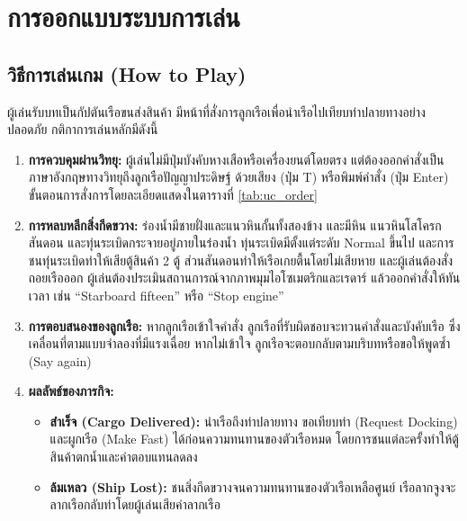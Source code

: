 \section{การออกแบบระบบการเล่น}

\subsection{วิธีการเล่นเกม (How to Play)}

ผู้เล่นรับบทเป็นกัปตันเรือขนส่งสินค้า มีหน้าที่สั่งการลูกเรือเพื่อนำเรือไปเทียบท่าปลายทางอย่างปลอดภัย กติกาการเล่นหลักมีดังนี้

\begin{enumerate}[label=\arabic*)]
    \item \textbf{การควบคุมผ่านวิทยุ:} ผู้เล่นไม่มีปุ่มบังคับหางเสือหรือเครื่องยนต์โดยตรง แต่ต้องออกคำสั่งเป็นภาษาอังกฤษทางวิทยุถึงลูกเรือปัญญาประดิษฐ์ ด้วยเสียง (ปุ่ม T) หรือพิมพ์คำสั่ง (ปุ่ม Enter) ขั้นตอนการสั่งการโดยละเอียดแสดงในตารางที่ \ref{tab:uc_order}
    \item \textbf{การหลบหลีกสิ่งกีดขวาง:} ร่องน้ำมีชายฝั่งและแนวหินกั้นทั้งสองข้าง และมีหิน แนวหินโสโครก สันดอน และทุ่นระเบิดกระจายอยู่ภายในร่องน้ำ ทุ่นระเบิดมีตั้งแต่ระดับ Normal ขึ้นไป และการชนทุ่นระเบิดทำให้เสียตู้สินค้า 2 ตู้ ส่วนสันดอนทำให้เรือเกยตื้นโดยไม่เสียหาย และผู้เล่นต้องสั่งถอยเรือออก ผู้เล่นต้องประเมินสถานการณ์จากภาพมุมไอโซเมตริกและเรดาร์ แล้วออกคำสั่งให้ทันเวลา เช่น ``Starboard fifteen'' หรือ ``Stop engine''
    \item \textbf{การตอบสนองของลูกเรือ:} หากลูกเรือเข้าใจคำสั่ง ลูกเรือที่รับผิดชอบจะทวนคำสั่งและบังคับเรือ ซึ่งเคลื่อนที่ตามแบบจำลองที่มีแรงเฉื่อย หากไม่เข้าใจ ลูกเรือจะตอบกลับตามบริบทหรือขอให้พูดซ้ำ (Say again)
    \item \textbf{ผลลัพธ์ของภารกิจ:}
    \begin{itemize}[leftmargin=1.5em,labelindent=0pt]
        \item \textbf{สำเร็จ (Cargo Delivered):} นำเรือถึงท่าปลายทาง ขอเทียบท่า (Request Docking) และผูกเรือ (Make Fast) ได้ก่อนความทนทานของตัวเรือหมด โดยการชนแต่ละครั้งทำให้ตู้สินค้าตกน้ำและค่าตอบแทนลดลง
        \item \textbf{ล้มเหลว (Ship Lost):} ชนสิ่งกีดขวางจนความทนทานของตัวเรือเหลือศูนย์ เรือลากจูงจะลากเรือกลับท่าโดยผู้เล่นเสียค่าลากเรือ
    \end{itemize}
\end{enumerate}

